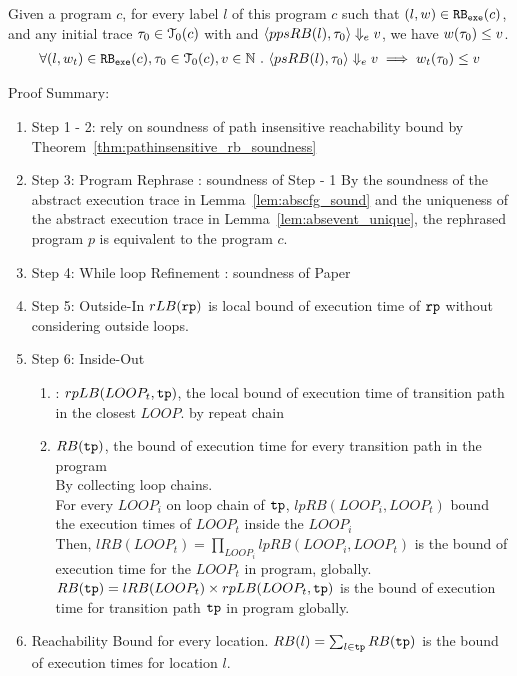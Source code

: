 \begin{thm}
  Given a program ${c}$, for every label $l$ of this program $c$ such that $(l, w) \in \mathtt{RB_{exe}}(c)$, 
  and any initial trace $\mathtt{\tau}_0 \in \mathcal{T}_0(c)$ with 
  and $\langle ppsRB(l), \mathtt{\tau}_0 \rangle \Downarrow_e v$,
  we have $ w(\mathtt{\tau}_0) \leq v $.
  \[
    \begin{array}{l}
    \forall (l, w_{t}) \in \mathtt{RB_{exe}}(c),
    \mathtt{\tau}_0 \in \mathcal{T}_0(c), 
    v \in \mathbb{N} ~.~
    \langle psRB(l), \mathtt{\tau}_0 \rangle \Downarrow_e v
    \implies
    w_{t}(\mathtt{\tau}_0) \leq v
    \end{array}
  \]
  \end{thm}
Proof Summary:
\begin{enumerate}
\item Step 1 - 2: rely on soundness of path insensitive reachability bound by Theorem~\ref{thm:pathinsensitive_rb_soundness}
\\
\item Step 3: Program Rephrase : soundness of Step - 1
By the soundness of the abstract execution trace in Lemma~\ref{lem:abscfg_sound}
and the uniqueness of the abstract execution trace in Lemma~\ref{lem:absevent_unique},
the rephrased program $p$ is equivalent to the program $c$.
\\
\item Step 4: While loop Refinement : soundness of Paper \cite{GulwaniJK09}
\\
\item Step 5: Outside-In 
$rLB(\mathtt{rp})$ is local bound of execution time of $\mathtt{rp}$ without considering outside loops.
\\
\item Step 6: Inside-Out
\begin{enumerate}
\item: $rpLB(LOOP_t, \mathtt{tp})$, the local bound of execution time of 
transition path in the closest $LOOP$.
by repeat chain 
\item $RB(\mathtt{tp})$, the bound of execution time for every transition path in the program
\\
By collecting loop chains.
\\
For every $LOOP_i$ on loop chain of $\mathtt{tp}$, $lpRB(LOOP_i, LOOP_t)$ bound the execution times of $LOOP_t$ inside the $LOOP_i$
\\
Then, $lRB(LOOP_t) = \prod_{LOOP_i} lpRB(LOOP_i, LOOP_t)$ is the bound of execution time for the $LOOP_t$ in program, globally.
\\
$RB(\mathtt{tp}) = lRB(LOOP_t) \times rpLB(LOOP_t, \mathtt{tp}) $ is the bound of execution time for transition path $\mathtt{tp}$ 
in program globally.
\end{enumerate}
\item Reachability Bound for every location.
$RB(l) = \sum_{l \in \mathtt{tp}}RB(\mathtt{tp})$ is the bound of execution times for location $l$.

\end{enumerate}
